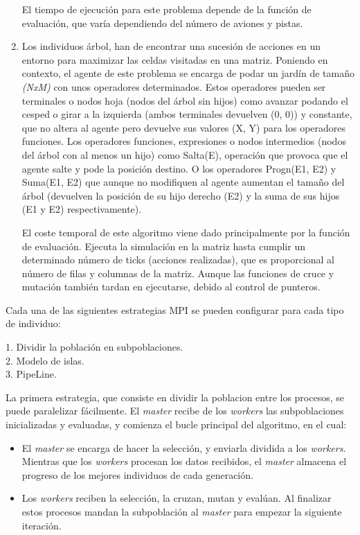 \begin{enumerate}
		El tiempo de ejecución para este problema depende de la función de evaluación, que varía dependiendo del número de aviones y pistas. 
		
		\item Los individuos árbol, han de encontrar una sucesión de acciones en un entorno para maximizar las celdas visitadas en una matriz. Poniendo en contexto, el agente de este problema se encarga de podar un jardín de tamaño \textit{(NxM)} con unos operadores determinados. Estos operadores pueden ser terminales o nodos hoja (nodos del árbol sin hijos) como avanzar podando el cesped o girar a la izquierda (ambos terminales devuelven (0, 0)) y constante, que no altera al agente pero devuelve sus valores (X, Y) para los operadores funciones. Los operadores funciones, expresiones o nodos intermedios (nodos del árbol con al menos un hijo) como Salta(E), operación que provoca que el agente salte y pode la posición destino. O los operadores Progn(E1, E2) y Suma(E1, E2) que aunque no modifiquen al agente aumentan el tamaño del árbol (devuelven la posición de su hijo derecho (E2) y la suma de sus hijos (E1 y E2) respectivamente).
		
		El coste temporal de este algoritmo viene dado principalmente por la función de evaluación. Ejecuta la simulación en la matriz hasta cumplir un determinado número de ticks (acciones realizadas), que es proporcional al número de filas y columnas de la matriz. Aunque las funciones de cruce y mutación también tardan en ejecutarse, debido al control de punteros.
	\end{enumerate}
	
	
	Cada una de las siguientes estrategias MPI se pueden configurar para cada tipo de individuo:
	\begin{flushleft}
		1. Dividir la población en subpoblaciones.\\
		2. Modelo de islas.\\
		3. PipeLine.\\
	\end{flushleft}
	
	La primera estrategia, que consiste en dividir la poblacion entre los procesos, se puede paralelizar fácilmente. El \textit{master} recibe de los \textit{workers} las subpoblaciones inicializadas y evaluadas, y comienza el bucle principal del algoritmo, en el cual:
	\begin{itemize}
		\item El \textit{master} se encarga de hacer la selección, y enviarla dividida a los \textit{workers}. Mientras que los \textit{workers} procesan los datos recibidos, el \textit{master} almacena el progreso de los mejores individuos de cada generación.
		\item Los \textit{workers} reciben la selección, la cruzan, mutan y evalúan. Al finalizar estos procesos mandan la subpoblación al \textit{master} para empezar la siguiente iteración.
	\end{itemize}
	
